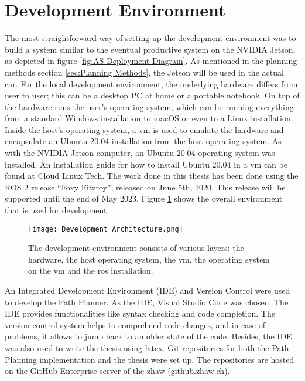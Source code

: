 \section{Development Environment} \label{sec:Development Environment}
The most straightforward way of setting up the development environment was to build a system similar to the eventual productive system on the NVIDIA Jetson, as depicted in figure \ref{fig:AS Deployment Diagram}.
As mentioned in the planning methods section \ref{sec:Planning Methods}, the Jetson will be used in the actual car.
For the local development environment, the underlying hardware differs from user to user; this can be a desktop PC at home or a portable notebook. On top of the hardware runs the user's operating system, which can be running everything from a standard Windows installation to macOS or even to a Linux installation. Inside the host's operating system, a \acrlong{vm} is used to emulate the hardware and encapsulate an Ubuntu 20.04 installation from the host operating system. As with the NVIDIA Jetson computer, an Ubuntu 20.04 operating system was installed. An installation guide for how to install Ubuntu 20.04 in a \acrshort{vm} can be found at Cloud Linux Tech. \cite{cloudlinuxtech_install_ubuntu_2004} The work done in this thesis has been done using the ROS 2 release ``Foxy Fitzroy'', released on June 5th, 2020. This release will be supported until the end of May 2023. \cite{ros2_releases_and_target_platforms}
Figure \ref{fig:Development Environment} shows the overall environment that is used for development.
\begin{figure}[H]
    \centering
    \texttt{[image: Development\_Architecture.png]}
    \caption{The development environment consists of various layers: the hardware, the host operating system, the \acrshort{vm}, the operating system on the \acrshort{vm} and the \acrshort{ros} installation.}
    \label{fig:Development Environment}
\end{figure}

An Integrated Development Environment (IDE) and Version Control were used to develop the Path Planner. As the IDE, Visual Studio Code was chosen. The IDE provides functionalities like syntax checking and code completion. The version control system helps to comprehend code changes, and in case of problems, it allows to jump back to an older state of the code. Besides, the IDE was also used to write the thesis using \Gls{latex}. Git repositories for both the Path Planning implementation and the thesis were set up. The repositories are hosted on the GitHub Enterprise server of the \acrshort{zhaw} (\href{https://github.zhaw.ch}{github.zhaw.ch}).

